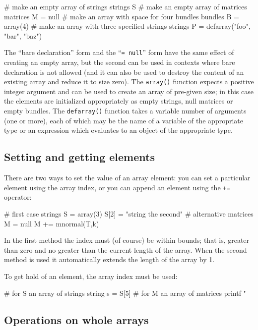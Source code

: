 \begin{code}
# make an empty array of strings
strings S
# make an empty array of matrices
matrices M = null
# make an array with space for four bundles
bundles B = array(4)
# make an array with three specified strings
strings P = defarray("foo", "bar", "baz")
\end{code}

The ``bare declaration'' form and the ``\texttt{= null}'' form have
the same effect of creating an empty array, but the second can be used
in contexts where bare declaration is not allowed (and it can also be
used to destroy the content of an existing array and reduce it to size
zero). The \texttt{array()} function expects a positive integer
argument and can be used to create an array of pre-given size; in this
case the elements are initialized appropriately as empty strings, null
matrices or empty bundles. The \texttt{defarray()} function takes a
variable number of arguments (one or more), each of which may be the
name of a variable of the appropriate type or an expression which
evaluates to an object of the appropriate type.

\subsection{Setting and getting elements}

There are two ways to set the value of an array element: you can set a
particular element using the array index, or you can append an element
using the \texttt{+=} operator:
\begin{code}
# first case
strings S = array(3)
S[2] = "string the second"
# alternative
matrices M = null
M += mnormal(T,k)
\end{code}

In the first method the index must (of course) be within bounds; that
is, greater than zero and no greater than the current length of the
array. When the second method is used it automatically extends the
length of the array by 1.

To get hold of an element, the array index must be used:
\begin{code}
# for S an array of strings
string s = S[5]
# for M an array of matrices
printf "\n%
\end{code}

\subsection{Operations on whole arrays}

